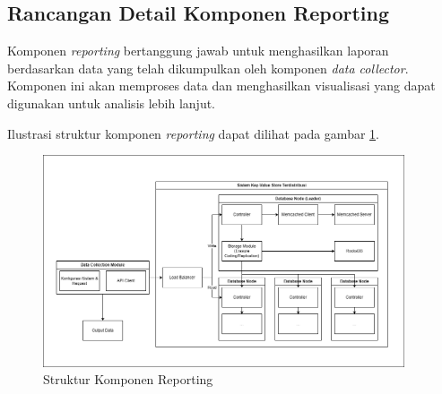 \subsection{Rancangan Detail Komponen Reporting}
\label{subsection:detail-reporting}

Komponen \textit{reporting} bertanggung jawab untuk menghasilkan laporan berdasarkan data yang telah dikumpulkan oleh komponen \textit{data collector}. Komponen ini akan memproses data dan menghasilkan visualisasi yang dapat digunakan untuk analisis lebih lanjut.

Ilustrasi struktur komponen \textit{reporting} dapat dilihat pada gambar \ref{fig:reporting-structure}.

\begin{figure}[ht]
    \centering
    \includegraphics[width=0.95\textwidth]{resources/chapter-3/general-architecture.png}
    \caption{Struktur Komponen Reporting}
    \label{fig:reporting-structure}
\end{figure}